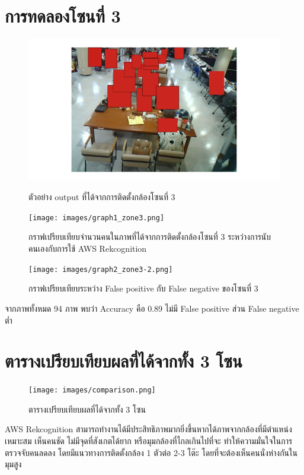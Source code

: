 \section{การทดลองโซนที่ 3}
\begin{figure}[ht]
    \centering
    \includegraphics[width=\textwidth]{images/modified_ESP32-CAM(27).png}
    \caption[ตัวอย่าง output ที่ได้จากการติดตั้งกล้องโซนที่ 3]{ตัวอย่าง output ที่ได้จากการติดตั้งกล้องโซนที่ 3}
    \label{fig:output3}
    \centering
    \texttt{[image: images/graph1\_zone3.png]}
    \caption[กราฟเปรียบเทียบจำนวนคนในภาพที่ได้จากการติดตั้งกล้องโซนที่ 3 ระหว่างการนับคนเองกับการใช้ AWS Rekcognition]{กราฟเปรียบเทียบจำนวนคนในภาพที่ได้จากการติดตั้งกล้องโซนที่ 3 ระหว่างการนับคนเองกับการใช้ AWS Rekcognition}
    \label{fig:graph1-3}
\end{figure}
\newpage
\begin{figure}[ht]
    \centering
    \texttt{[image: images/graph2\_zone3-2.png]}
    \caption[กราฟเปรียบเทียบระหว่าง False positive กับ False negative ของโซนที่ 3]{กราฟเปรียบเทียบระหว่าง False positive กับ False negative ของโซนที่ 3}
    \label{fig:graph2-3}
\end{figure}
จากภาพทั้งหมด 94 ภาพ พบว่า Accuracy คือ 0.89 ไม่มี False positive ส่วน False negative ต่ำ

\newpage
\section{ตารางเปรียบเทียบผลที่ได้จากทั้ง 3 โซน}
\begin{figure}[ht]
    \centering
    \texttt{[image: images/comparison.png]}
    \caption[ตารางเปรียบเทียบผลที่ได้จากทั้ง 3 โซน]{ตารางเปรียบเทียบผลที่ได้จากทั้ง 3 โซน}
    \label{fig:comparison}
\end{figure}
AWS Rekcognition สามารถทํางานได้มีประสิทธิภาพมากยิ่งขึ้นหากได้ภาพจากกล้องที่มีตําแหน่งเหมาะสม เห็นคนชัด ไม่มีจุดที่สังเกตได้ยาก หรือมุมกล้องที่ไกลเกินไปที่จะ
ทําให้ความมั่นใจในการตรวจจับคนลดลง โดยมีแนวทางการติดตั้งกล้อง 1 ตัวต่อ 2-3 โต๊ะ
โดยที่จะต้องเห็นคนนั่งห่างกันในมุมสูง

